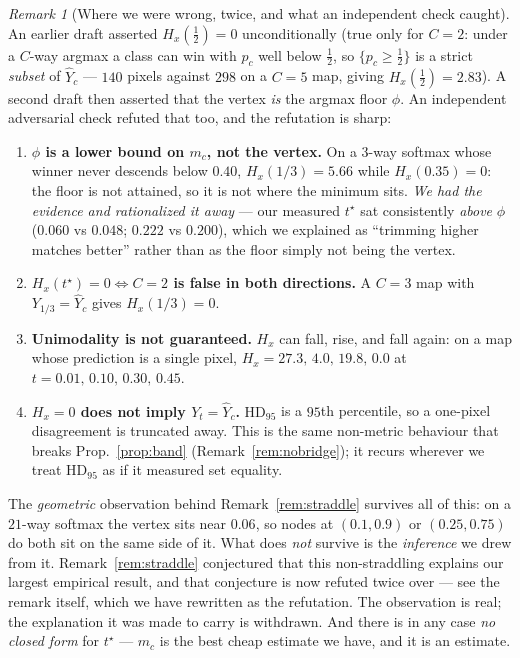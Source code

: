 \documentclass[11pt]{article}
\theoremstyle{remark}
\newtheorem{remark}{Remark}
\newcommand{\Yhat}{\widehat{Y}}
\newcommand{\HDF}{\mathrm{HD}_{95}}
\begin{document}
\begin{remark}[Where we were wrong, twice, and what an independent check caught]\label{rem:vshapefails}
An earlier draft asserted $H_x(\tfrac12)=0$ unconditionally (true only for $C=2$: under
a $C$-way argmax a class can win with $p_c$ well below $\tfrac12$, so
$\{p_c\ge\tfrac12\}$ is a strict \emph{subset} of $\Yhat_c$ --- $140$ pixels against
$298$ on a $C{=}5$ map, giving $H_x(\tfrac12)=2.83$). A second draft then asserted that
the vertex \emph{is} the argmax floor $\phi$. An independent adversarial check refuted
that too, and the refutation is sharp:
\begin{enumerate}
\item \textbf{$\phi$ is a lower bound on $m_c$, not the vertex.} On a $3$-way softmax
whose winner never descends below $0.40$, $H_x(1/3) = 5.66$ while $H_x(0.35)=0$: the
floor is not attained, so it is not where the minimum sits. \emph{We had the evidence
and rationalized it away} --- our measured $t^\star$ sat consistently \emph{above}
$\phi$ ($0.060$ vs $0.048$; $0.222$ vs $0.200$), which we explained as ``trimming
higher matches better'' rather than as the floor simply not being the vertex.
\item \textbf{$H_x(t^\star)=0 \iff C=2$ is false in both directions.} A $C{=}3$ map with
$Y_{1/3} = \Yhat_c$ gives $H_x(1/3)=0$.
\item \textbf{Unimodality is not guaranteed.} $H_x$ can fall, rise, and fall again: on a
map whose prediction is a single pixel, $H_x = 27.3,\,4.0,\,19.8,\,0.0$ at
$t = 0.01,\,0.10,\,0.30,\,0.45$.
\item \textbf{$H_x = 0$ does not imply $Y_t = \Yhat_c$.} $\HDF$ is a $95$th percentile,
so a one-pixel disagreement is truncated away. This is the same non-metric behaviour
that breaks Prop.~\ref{prop:band} (Remark~\ref{rem:nobridge}); it recurs wherever we
treat $\HDF$ as if it measured set equality.
\end{enumerate}
The \emph{geometric} observation behind Remark~\ref{rem:straddle} survives all of this:
on a $21$-way softmax the vertex sits near $0.06$, so nodes at $(0.1,0.9)$ or
$(0.25,0.75)$ do both sit on the same side of it. What does \emph{not} survive is the
\emph{inference} we drew from it. Remark~\ref{rem:straddle} conjectured that this
non-straddling explains our largest empirical result, and that conjecture is now
refuted twice over --- see the remark itself, which we have rewritten as the refutation.
The observation is real; the explanation it was made to carry is withdrawn. And there is
in any case \emph{no closed form} for $t^\star$ --- $m_c$ is the best cheap estimate we
have, and it is an estimate.
\end{remark}
\end{document}
